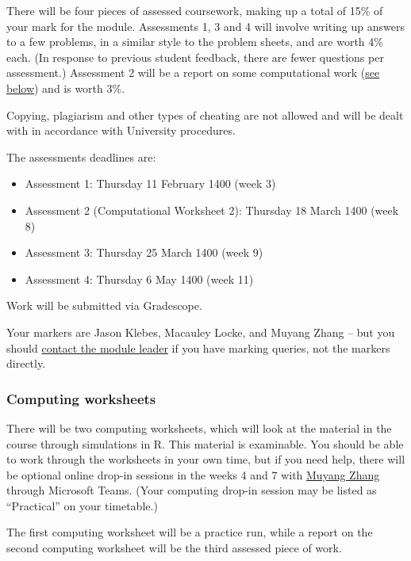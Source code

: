 \documentclass[
  a4paper,
]{article}
\providecommand{\tightlist}{%
  \setlength{\itemsep}{0pt}\setlength{\parskip}{0pt}}
\theoremstyle{definition}
\theoremstyle{definition}
\theoremstyle{definition}
\theoremstyle{remark}
\begin{document}
There will be four pieces of assessed coursework, making up a total of 15\% of your mark for the module. Assessments 1, 3 and 4 will involve writing up answers to a few problems, in a similar style to the problem sheets, and are worth 4\% each. (In response to previous student feedback, there are fewer questions per assessment.) Assessment 2 will be a report on some computational work (\protect\hyperlink{about--computing}{see below}) and is worth 3\%.

Copying, plagiarism and other types of cheating are not allowed and will be dealt with in accordance with University procedures.

The assessments deadlines are:

\begin{itemize}
\tightlist
\item
  Assessment 1: Thursday 11 February 1400 (week 3)
\item
  Assessment 2 (Computational Worksheet 2): Thursday 18 March 1400 (week 8)
\item
  Assessment 3: Thursday 25 March 1400 (week 9)
\item
  Assessment 4: Thursday 6 May 1400 (week 11)
\end{itemize}

Work will be submitted via Gradescope.

Your markers are Jason Klebes, Macauley Locke, and Muyang Zhang -- but you should \href{mailto:m.aldridge@leeds.ac.uk}{contact the module leader} if you have marking queries, not the markers directly.

\hypertarget{about-computing}{%
\subsubsection*{Computing worksheets}\label{about-computing}}

There will be two computing worksheets, which will look at the material in the course through simulations in R. This material is examinable. You should be able to work through the worksheets in your own time, but if you need help, there will be optional online drop-in sessions in the weeks 4 and 7 with \href{https://eps.leeds.ac.uk/maths/pgr/6422/muyang-zhang}{Muyang Zhang} through Microsoft Teams. (Your computing drop-in session may be listed as ``Practical'' on your timetable.)

The first computing worksheet will be a practice run, while a report on the second computing worksheet will be the third assessed piece of work.
\end{document}
